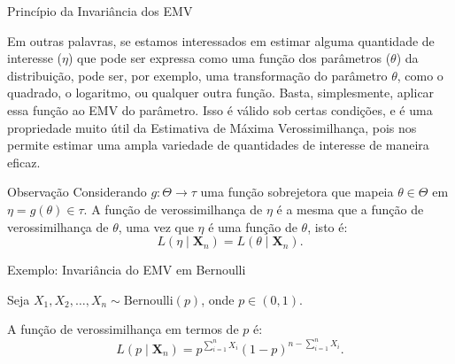 \documentclass[12pt]{beamer}
\begin{document}
\begin{frame}{Princípio da Invariância dos EMV}
\begin{block}{}
\justifying
Em outras palavras, se estamos interessados em estimar alguma quantidade de interesse (\(\eta\)) que pode ser expressa como uma função dos parâmetros (\(\theta\)) da distribuição, pode ser, por exemplo, uma transformação do parâmetro $\theta$, como o quadrado, o logaritmo, ou qualquer outra função. Basta, simplesmente, aplicar essa função ao EMV do parâmetro. Isso é válido sob certas condições, e é uma propriedade muito útil da Estimativa de Máxima Verossimilhança, pois nos permite estimar uma ampla variedade de quantidades de interesse de maneira eficaz.
\end{block}
\end{frame}

\begin{frame}{}
	\begin{block}{Observação}
		\justifying
		Considerando \( g: \Theta \rightarrow \tau \) uma função sobrejetora que mapeia \( \theta \in \Theta \) em \( \eta = g(\theta) \in \tau \). A função de verossimilhança de \( \eta \) é a mesma que a função de verossimilhança de \( \theta \), uma vez que \( \eta \) é uma função de \( \theta \), isto é:
		\[
		L(\eta \mid \boldsymbol{X}_{n}) = L(\theta \mid \boldsymbol{X}_{n}).
		\]
	\end{block}
\end{frame}

\begin{frame}{Exemplo: Invariância do EMV em Bernoulli}
	\begin{block}{}
		\justifying
	Seja $X_1, X_2, \ldots, X_n \sim \text{Bernoulli}(p)$, onde $p \in (0,1)$. 
	
	A função de verossimilhança em termos de $p$ é:
	\[
	L(p \mid \mathbf{X}_n) = p^{\sum_{i=1}^n X_i}(1-p)^{n-\sum_{i=1}^n X_i}.
	\]
\end{block}
\end{frame}
\end{document}

